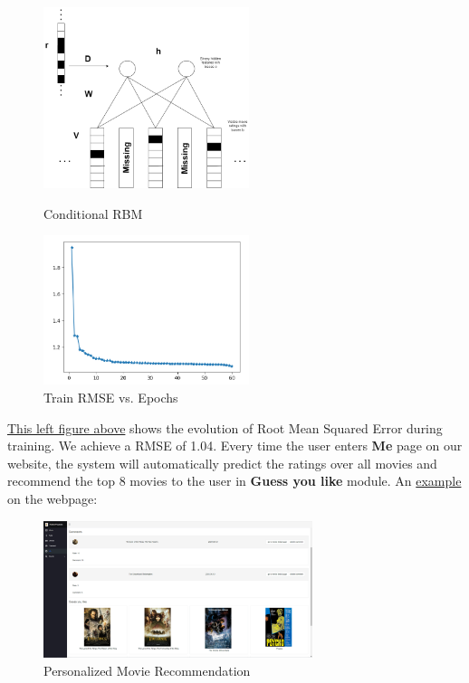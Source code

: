 \begin{CJK*}{UTF8}{gbsn}
\begin{figure}[htbp]
\centering
\label{RBM}
\begin{minipage}[t]{0.45\textwidth}
\centering
\includegraphics[width=6cm]{conditionalRBM.png}
\caption{Conditional RBM}
\end{minipage}
\begin{minipage}[t]{0.45\textwidth}
\centering
\includegraphics[width=6cm]{RBMResult.png}
\caption{Train RMSE vs. Epochs}
\end{minipage}
\end{figure}

\hyperref[RBM]{This left figure above} shows the evolution of Root Mean Squared Error during training. We achieve a RMSE of 1.04. Every time the user enters \textbf{Me} page on our website, the system will automatically predict the ratings over all movies and recommend the top 8 movies to the user in \textbf{Guess you like} module. An \hyperref[recommend]{example} on the webpage:

\begin{figure}[h]
    \centering
    \label{recommend}
    \includegraphics[width = 0.7\textwidth]{recommendation.png}
    \caption{Personalized Movie Recommendation}
\end{figure}


\end{CJK*}
